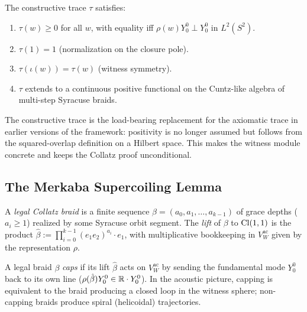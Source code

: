 \begin{proposition}
\label{prop:trace-acoustic-props}
The constructive trace $\tau$ satisfies:
\begin{enumerate}[label=\textnormal{(\arabic*)}]
\item $\tau(w) \ge 0$ for all $w$, with equality iff
  $\rho(w) Y_0^0 \perp Y_0^0$ in $L^2(S^2)$.
\item $\tau(1) = 1$ (normalization on the closure pole).
\item $\tau(\iota(w)) = \tau(w)$ (witness symmetry).
\item $\tau$ extends to a continuous positive functional on the
  Cuntz-like algebra of multi-step Syracuse braids.
\end{enumerate}
\end{proposition}

The constructive trace is the load-bearing replacement for the
axiomatic trace in earlier versions of the framework: positivity is
no longer assumed but follows from the squared-overlap definition
on a Hilbert space.  This makes the witness module concrete and
keeps the Collatz proof unconditional.

\subsection{The Merkaba Supercoiling Lemma}

\begin{definition}
\label{def:legal-braid}
A \emph{legal Collatz braid} is a finite sequence
$\beta = (a_0, a_1, \ldots, a_{k-1})$ of grace depths
($a_i \ge 1$) realized by some Syracuse orbit segment.  The
\emph{lift} of $\beta$ to $\mathrm{Cl}(1,1)$ is the product
$\hat\beta := \prod_{i=0}^{k-1} (e_1 e_2)^{a_i} \cdot e_1$, with
multiplicative bookkeeping in $V_W^{\mathrm{ac}}$ given by the
representation $\rho$.
\end{definition}

\begin{definition}
\label{def:cap-criterion}
A legal braid $\beta$ \emph{caps} if its lift $\hat\beta$ acts on
$V_W^{\mathrm{ac}}$ by sending the fundamental mode $Y_0^0$ back to
its own line ($\rho(\hat\beta) Y_0^0 \in \mathbb{R} \cdot Y_0^0$).  In the
acoustic picture, capping is equivalent to the braid producing a
closed loop in the witness sphere; non-capping braids produce
spiral (helicoidal) trajectories.
\end{definition}

